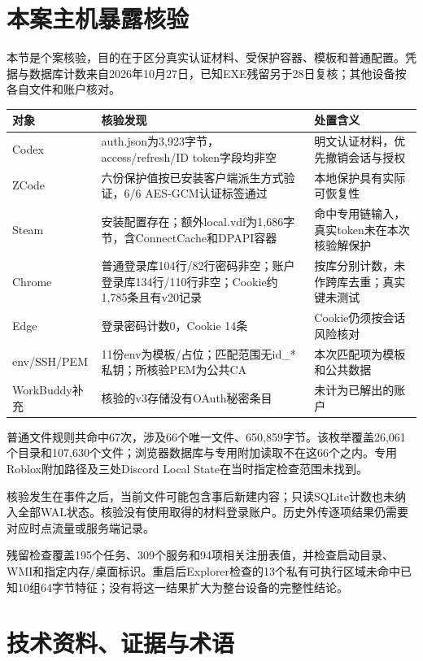 \documentclass[UTF8,a4paper,zihao=5,fontset=windows]{ctexart}
\newcommand{\code}[1]{{\ttfamily\small #1}}
\begin{document}
\clearpage\section{本案主机暴露核验}
\label{app:case}
本节是个案核验，目的在于区分真实认证材料、受保护容器、模板和普通配置。凭据与数据库计数来自2026年10月27日，已知EXE残留另于28日复核；其他设备按各自文件和账户核对。

\begin{longtable}{@{}L{26mm}L{83mm}L{41mm}@{}}\toprule 对象 & 核验发现 & 处置含义\\\midrule\endhead
Codex & \code{auth.json}为3,923字节，access/refresh/ID token字段均非空 & 明文认证材料，优先撤销会话与授权\\
ZCode & 六份保护值按已安装客户端派生方式验证，6/6 AES-GCM认证标签通过 & 本地保护具有实际可恢复性\\
Steam & 安装配置存在；额外\code{local.vdf}为1,686字节，含ConnectCache和DPAPI容器 & 命中专用链输入，真实token未在本次核验解保护\\
Chrome & 普通登录库104行/82行密码非空；账户登录库134行/110行非空；Cookie约1,785条且有v20记录 & 按库分别计数，未作跨库去重；真实键未测试\\
Edge & 登录密码计数0，Cookie 14条 & Cookie仍须按会话风险核对\\
env/SSH/PEM & 11份env为模板/占位；匹配范围无id\_*私钥；所核验PEM为公共CA & 本次匹配项为模板和公共数据\\
WorkBuddy补充 & 核验的v3存储没有OAuth秘密条目 & 未计为已解出的账户\\\bottomrule\end{longtable}

普通文件规则共命中67次，涉及66个唯一文件、650,859字节。该枚举覆盖26,061个目录和107,630个文件；浏览器数据库与专用附加读取不在这66个之内。专用Roblox附加路径及三处Discord Local State在当时指定检查范围未找到。

核验发生在事件之后，当前文件可能包含事后新建内容；只读SQLite计数也未纳入全部WAL状态。核验没有使用取得的材料登录账户。历史外传逐项结果仍需要对应时点流量或服务端记录。

残留检查覆盖195个任务、309个服务和94项相关注册表值，并检查启动目录、WMI和指定内存/桌面标识。重启后Explorer检查的13个私有可执行区域未命中已知10组64字节特征；没有将这一结果扩大为整台设备的完整性结论。

\clearpage\section{技术资料、证据与术语}
\label{app:reading}
\end{document}
